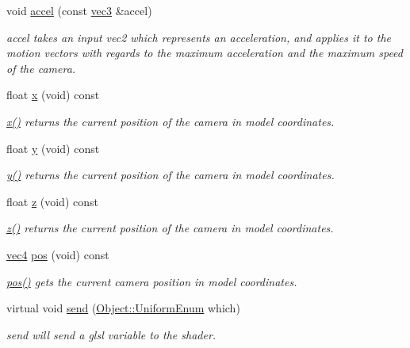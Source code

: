 \begin{DoxyCompactItemize}
void \hyperlink{class_camera_abee6a36602b8044478739cea9221ed41}{accel} (const \hyperlink{struct_angel_1_1vec3}{vec3} \&accel)
\begin{DoxyCompactList}\small\item\em accel takes an input vec2 which represents an acceleration, and applies it to the motion vectors with regards to the maximum acceleration and the maximum speed of the camera. \end{DoxyCompactList}\item 
float \hyperlink{class_camera_ab84abdd525581fbaf0462595d0a087d6}{x} (void) const 
\begin{DoxyCompactList}\small\item\em \hyperlink{class_camera_ab84abdd525581fbaf0462595d0a087d6}{x()} returns the current position of the camera in model coordinates. \end{DoxyCompactList}\item 
float \hyperlink{class_camera_a68d0865ed19510ee41c6477511d70185}{y} (void) const 
\begin{DoxyCompactList}\small\item\em \hyperlink{class_camera_a68d0865ed19510ee41c6477511d70185}{y()} returns the current position of the camera in model coordinates. \end{DoxyCompactList}\item 
float \hyperlink{class_camera_ab1167495c547046c57b1c417e53c39f6}{z} (void) const 
\begin{DoxyCompactList}\small\item\em \hyperlink{class_camera_ab1167495c547046c57b1c417e53c39f6}{z()} returns the current position of the camera in model coordinates. \end{DoxyCompactList}\item 
\hyperlink{struct_angel_1_1vec4}{vec4} \hyperlink{class_camera_a9982ac5f48fe0af97fefa725080d6da6}{pos} (void) const 
\begin{DoxyCompactList}\small\item\em \hyperlink{class_camera_a9982ac5f48fe0af97fefa725080d6da6}{pos()} gets the current camera position in model coordinates. \end{DoxyCompactList}\item 
virtual void \hyperlink{class_camera_a401decef27b59d6485b4ab9762f5b9e6}{send} (\hyperlink{class_object_a79b74057dbc5182b85c9c3ba8480fcf2}{Object\-::\-Uniform\-Enum} which)
\begin{DoxyCompactList}\small\item\em send will send a glsl variable to the shader. \end{DoxyCompactList}\item 

\end{DoxyCompactItemize}
